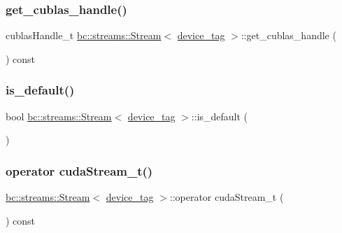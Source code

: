 \subsubsection{\texorpdfstring{get\+\_\+cublas\+\_\+handle()}{get\_cublas\_handle()}}
{\footnotesize\ttfamily cublas\+Handle\+\_\+t \hyperlink{classbc_1_1streams_1_1Stream}{bc\+::streams\+::\+Stream}$<$ \hyperlink{structbc_1_1device__tag}{device\+\_\+tag} $>$\+::get\+\_\+cublas\+\_\+handle (\begin{DoxyParamCaption}{ }\end{DoxyParamCaption}) const\hspace{0.3cm}{\ttfamily [inline]}}

\mbox{\label{classbc_1_1streams_1_1Stream_3_01device__tag_01_4_a36a2ac18cb901c755e5885d0a96a9c42}} 
\subsubsection{\texorpdfstring{is\+\_\+default()}{is\_default()}}
{\footnotesize\ttfamily bool \hyperlink{classbc_1_1streams_1_1Stream}{bc\+::streams\+::\+Stream}$<$ \hyperlink{structbc_1_1device__tag}{device\+\_\+tag} $>$\+::is\+\_\+default (\begin{DoxyParamCaption}{ }\end{DoxyParamCaption})\hspace{0.3cm}{\ttfamily [inline]}}

\mbox{\label{classbc_1_1streams_1_1Stream_3_01device__tag_01_4_a161ebe574d652fb8c0836866b1f0c127}} 
\subsubsection{\texorpdfstring{operator cuda\+Stream\+\_\+t()}{operator cudaStream\_t()}}
{\footnotesize\ttfamily \hyperlink{classbc_1_1streams_1_1Stream}{bc\+::streams\+::\+Stream}$<$ \hyperlink{structbc_1_1device__tag}{device\+\_\+tag} $>$\+::operator cuda\+Stream\+\_\+t (\begin{DoxyParamCaption}{ }\end{DoxyParamCaption}) const\hspace{0.3cm}{\ttfamily [inline]}}


